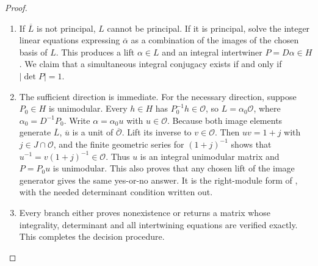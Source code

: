 \begin{proof}
\begin{enumerate}[label=\arabic*.]
\item If $\overline L$ is not principal, $L$ cannot be principal. If it is
principal, solve the integer linear equations expressing
$\overline\alpha$ as a combination of the images of the chosen basis
of $L$. This produces a lift $\alpha\in L$ and an integral
intertwiner $P=D\alpha\in H$. We claim that a simultaneous integral
conjugacy exists if and only if $|\det P|=1$.

\item The sufficient direction is immediate. For the necessary direction,
suppose $P_0\in H$ is unimodular. Every $h\in H$ has
$P_0^{-1}h\in\mathcal O$, so
$L=\alpha_0\mathcal O$, where $\alpha_0=D^{-1}P_0$.
Write $\alpha=\alpha_0u$ with $u\in\mathcal O$.
Because both image elements generate $\overline L$,
$\overline u$ is a unit of $\overline{\mathcal O}$.
Lift its inverse to $v\in\mathcal O$. Then $uv=1+j$ with
$j\in J\cap\mathcal O$, and the finite geometric series for
$(1+j)^{-1}$ shows that $u^{-1}=v(1+j)^{-1}\in\mathcal O$.
Thus $u$ is an integral unimodular matrix and
$P=P_0u$ is unimodular. This also proves that any chosen lift of the
image generator gives the same yes-or-no answer. It is the
right-module form of \cite[Theorem 3.4, p.~6; Propositions 8.1--8.2, p.~21]{rootBHJ22},
with the needed determinant condition written out.

\item Every branch either proves nonexistence or returns a matrix whose
integrality, determinant and all intertwining equations are verified
exactly. This completes the decision procedure.

\end{enumerate}
\end{proof}




